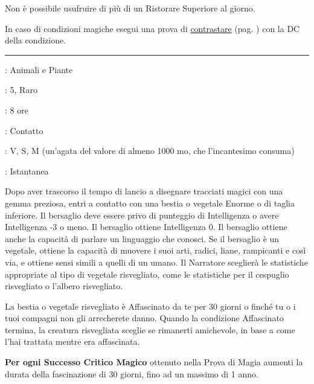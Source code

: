 \begin{multicols}{2}
Non è possibile usufruire di più di un Ristorare Superiore al giorno.

In caso di condizioni magiche esegui una prova di \hyperlink{contrastareincantesimi}{contrastare} (pag. \pageref{contrastareincantesimi}) con la DC della condizione.

\smallskip\noindent\rule{\linewidth}{2pt} \hypertarget{Risveglio}{}\medskip{}
\noindent
\begin{description}[noitemsep, topsep=0pt, parsep=0pt, partopsep=0pt, leftmargin=0cm, labelwidth=2.8cm]
	\item[\textbf{Lista di Magia}]: Animali e Piante
	\item[\textbf{Livello}]: 5, Raro
	\item[\textbf{T. di Lancio}]: 8 ore
	\item[\textbf{Gittata}]: Contatto
	\item[\textbf{Componenti}]: V, S, M (un'agata del valore di almeno 1000 mo, che l'incantesimo consuma)
	\item[\textbf{Durata}]: Istantanea
\end{description}

Dopo aver trascorso il tempo di lancio a disegnare tracciati magici con una gemma preziosa, entri a contatto con una bestia o vegetale Enorme o di taglia inferiore. Il bersaglio deve essere privo di punteggio di Intelligenza o avere Intelligenza -3 o meno. Il bersaglio ottiene Intelligenza 0. Il bersaglio ottiene anche la capacità di parlare un linguaggio che conosci. Se il bersaglio è un vegetale, ottiene la capacità di muovere i suoi arti, radici, liane, rampicanti e così via, e ottiene sensi simili a quelli di un umano. Il Narratore sceglierà le statistiche appropriate al tipo di vegetale risvegliato, come le statistiche per il cespuglio risvegliato o l'albero risvegliato.

La bestia o vegetale risvegliato è Affascinato da te per 30 giorni o finché tu o i tuoi compagni non gli arrecherete danno. Quando la condizione Affascinato termina, la creatura risvegliata sceglie se rimanerti amichevole, in base a come l'hai trattata mentre era affascinata.

\textbf{Per ogni Successo Critico Magico} ottenuto nella Prova di Magia aumenti la durata della fascinazione di 30 giorni, fino ad un massimo di 1 anno.


\end{multicols}

